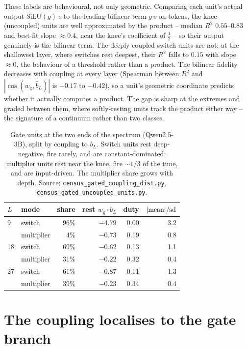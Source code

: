 \documentclass[11pt]{article}
\newcommand{\bl}{b_L}
\newcommand{\blh}{\hat{b}_L}
\newcommand{\wg}{w_{\mathrm{g}}}
\begin{document}
These labels are behavioural, not only geometric. Comparing each unit's actual
output $\mathrm{SiLU}(g)\,v$ to the leading bilinear term $g\,v$ on tokens, the
knee (uncoupled) units are well approximated by the product -- median $R^2$
$0.55$--$0.83$ and best-fit slope $\approx 0.4$, near the knee's coefficient of
$\tfrac12$ -- so their output genuinely is the bilinear term. The deeply-coupled
switch units are not: at the shallowest layer, where switches rest deepest, their
$R^2$ falls to $0.15$ with slope $\approx 0$, the behaviour of a threshold rather
than a product. The bilinear fidelity decreases with coupling at every layer
(Spearman between $R^2$ and $|\cos(\wg,\blh)|$ is $-0.17$ to $-0.42$), so a unit's
geometric coordinate predicts whether it actually computes a product. The gap is
sharp at the extremes and graded between them, where softly-resting units track
the product either way -- the signature of a continuum rather than two classes.

\begin{table}[t]
\centering\small
\begin{tabular}{llrrrr}
\toprule
$L$ & mode & share & rest $\wg\!\cdot\!\bl$ & duty & $|{\rm mean}|/{\rm sd}$ \\
\midrule
9  & switch     & 96\% & $-4.79$ & 0.00 & 3.2 \\
   & multiplier &  4\% & $-0.73$ & 0.19 & 0.8 \\
18 & switch     & 69\% & $-0.62$ & 0.13 & 1.1 \\
   & multiplier & 31\% & $-0.22$ & 0.32 & 0.4 \\
27 & switch     & 61\% & $-0.87$ & 0.11 & 1.3 \\
   & multiplier & 39\% & $-0.23$ & 0.34 & 0.4 \\
\bottomrule
\end{tabular}
\caption{Gate units at the two ends of the spectrum (Qwen2.5-3B), split by
coupling to $\bl$. Switch units rest deep-negative, fire rarely, and are
constant-dominated; multiplier units rest near the knee, fire $\sim\!1/3$ of the
time, and are input-driven. The multiplier share grows with depth. Source:
\texttt{census\_gated\_coupling\_dist.py}, \texttt{census\_gated\_uncoupled\_units.py}.}
\label{tab:modes}
\end{table}

\section{The coupling localises to the gate branch}
\label{sec:localize}
\end{document}
